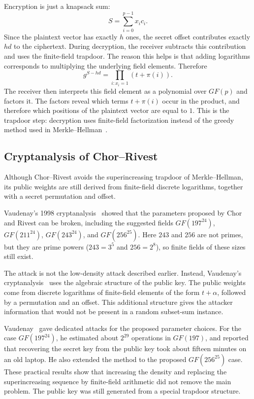 Encryption is just a knapsack sum:
\[
    S=\sum_{i=0}^{p-1} x_i c_i.
\]
Since the plaintext vector has exactly \(h\) ones, the secret offset contributes
exactly \(hd\) to the ciphertext. During decryption, the receiver subtracts
this contribution and uses the finite-field trapdoor. The reason this helps is
that adding logarithms corresponds to multiplying the underlying field
elements. Therefore
\[
    g^{S-hd}
    =
    \prod_{i:x_i=1}(t+\pi(i)).
\]
The receiver then interprets this field element as a polynomial over \(GF(p)\)
and factors it. The factors reveal which terms \(t+\pi(i)\) occur in the
product, and therefore which positions of the plaintext vector are equal to
\(1\). This is the trapdoor step: decryption uses finite-field factorization
instead of the greedy method used in Merkle--Hellman~\cite{ChorRivest1988}.

\subsection{Cryptanalysis of Chor--Rivest}

Although Chor--Rivest avoids the superincreasing trapdoor of Merkle--Hellman,
its public weights are still derived from finite-field discrete logarithms,
together with a secret permutation and offset.

Vaudenay's 1998 cryptanalysis~\cite[pp.~243--245]{Vaudenay1998} showed that the parameters proposed by Chor and
Rivest can be broken, including the suggested fields $GF(197^{24})$,
$GF(211^{24})$, $GF(243^{24})$, and $GF(256^{25})$. Here \(243\) and \(256\)
are not primes, but they are prime powers (\(243=3^5\) and \(256=2^8\)), so
finite fields of these sizes still exist.

The attack is not the low-density attack described earlier. Instead,
Vaudenay's cryptanalysis~\cite[pp.~244--245]{Vaudenay1998} uses the
algebraic structure of the public key. The public weights come from discrete
logarithms of finite-field elements of the form $t+\alpha$, followed by a
permutation and an offset. This additional structure gives the attacker
information that would not be present in a random subset-sum
instance.

Vaudenay~\cite[pp.~252--255]{Vaudenay1998} gave dedicated attacks for the proposed parameter choices. For the
case $GF(197^{24})$, he estimated about $2^{29}$ operations in $GF(197)$, and
reported that recovering the secret key from the public key took about fifteen
minutes on an old laptop. He also extended the method to the proposed
$GF(256^{25})$ case. These practical results
show that increasing the density and replacing the superincreasing sequence by
finite-field arithmetic did not remove the main problem. The public key was
still generated from a special trapdoor structure.

